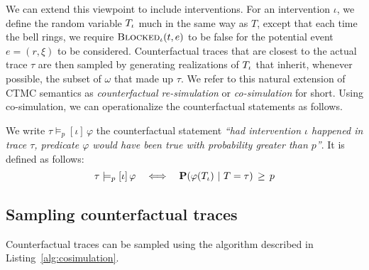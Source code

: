 We can extend this viewpoint to include interventions. For an
intervention $\iota$, we define the random variable ${T_\iota}{}$ much in
the same way as $T$, except that each time the bell rings, we require
${\textsc{Blocked}}_{\iota}(t, e)$ to be false for the potential event
$e=(r, \xi)$ to be considered.  Counterfactual traces that are closest
to the actual trace $\tau$ are then sampled by generating realizations
of ${T_\iota}{}$ that inherit, whenever possible, the subset of $\omega$
that made up $\tau$. 
We refer to this natural extension of CTMC semantics as
\textit{counterfactual re-simulation} or \textit{co-simulation} for
short. Using co-simulation, we can operationalize the counterfactual
statements as follows.

\begin{definition} We write
  $\tau \models_p [\iota] \, \varphi$ the counterfactual statement
  \textit{``had intervention $\iota$ happened in trace $\tau$,
    predicate $\varphi$ would have been true with probability greater
    than $p$''}.  It is defined as follows:
  \[ \tau \models_p [\iota] \, \varphi \quad \Longleftrightarrow \quad
    \mathbf{P}( \varphi({T_\iota}{}) \ |\ T = \tau) \,\geq\, p \]
\end{definition}

\subsection{Sampling counterfactual traces}

Counterfactual traces can be sampled using the algorithm described in
Listing~\ref{alg:cosimulation}.


